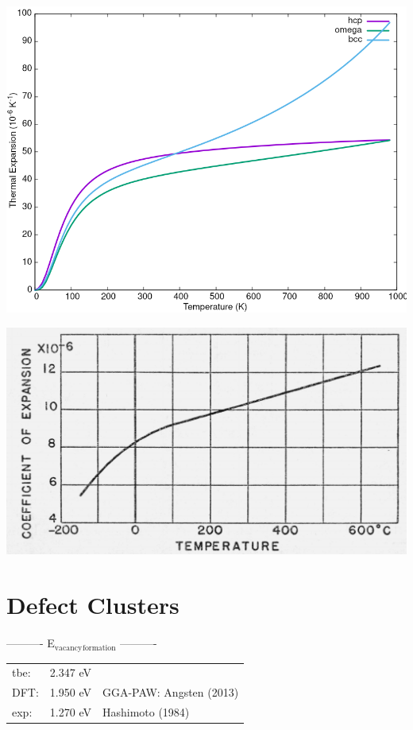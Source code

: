 \documentclass[11pt]{article}
\begin{document}
\begin{center}
\includegraphics[width=.9\linewidth]{Images/thermal_expansion_all_phases_2020-04-02.png}
\end{center}

\begin{center}
\includegraphics[width=.9\linewidth]{Images/thermal_expansion_alpha_ti_exp.png}
\end{center}

\section{Defect Clusters}
\label{sec:orga55a1b4}

----------     E\(_{\text{vacancy}}\)\(_{\text{formation}}\)     ----------

\begin{center}
\begin{tabular}{lll}
tbe: & 2.347  eV & \\
DFT: & 1.950  eV & GGA-PAW:   Angsten  (2013)\\
exp: & 1.270  eV & Hashimoto  (1984)\\
\end{tabular}
\end{center}
\end{document}
